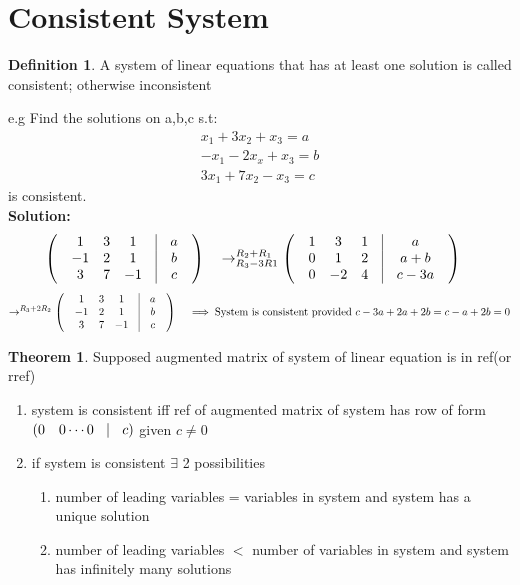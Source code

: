 \documentclass{article}
\theoremstyle{definition}
\newtheorem{definition}{Definition}[section]
\theoremstyle{thrm}
\newtheorem{thrm}{Theorem}[section]
\begin{document}
\section{Consistent System}
\begin{definition}
	A system of linear equations that has at least one solution is called consistent; otherwise inconsistent
\end{definition}
e.g Find the solutions on a,b,c s.t:
\begin{align*}
x_1+3x_2+x_3=a\\
-x_1-2x_x+x_3=b\\
3x_1+7x_2-x_3=c	
\end{align*}
is consistent.\\
\textbf{Solution:}
\begin{equation*}
	\begin{pmatrix}
	& 1 & 3 & 1 &\vline &a &\\
	& -1 & 2 & 1 &\vline &b &\\
	& 3 & 7 & -1 &\vline &c &
	\end{pmatrix}\quad \rightarrow^{R_2+R_1}_{R_3-3R1}
	\begin{pmatrix}
	& 1 & 3 & 1 &\vline & a &\\
	& 0 & 1 & 2 &\vline & a+b &\\
	& 0 & -2 & 4 &\vline & c-3a &
	\end{pmatrix} \quad
\end{equation*}
\begin{equation*}
\rightarrow^{R_3+2R_2}
	\begin{pmatrix}
	& 1 & 3 & 1 &\vline &a &\\
	& -1 & 2 & 1 &\vline &b &\\
	& 3 & 7 & -1 &\vline &c &
	\end{pmatrix}\quad \implies \text{System is consistent provided $c-3a+2a+2b=c-a+2b=0$}
\end{equation*}
\theoremstyle{thrm}
\begin{thrm}
	Supposed augmented matrix of system of linear equation is in ref(or rref)
	\begin{enumerate}
		\item system is consistent iff ref of augmented matrix of system has row of form $(0\quad 0 \cdots 0 \quad \vline \quad c) $ given $c \neq 0$
		\item if system is consistent $\exists$ 2 possibilities
		\begin{enumerate}
			\item number of leading variables = variables in system and system has a unique solution
			\item number of leading variables $<$ number of variables in system and system has infinitely many solutions
		\end{enumerate}	
	\end{enumerate}
\end{thrm}
\end{document}
